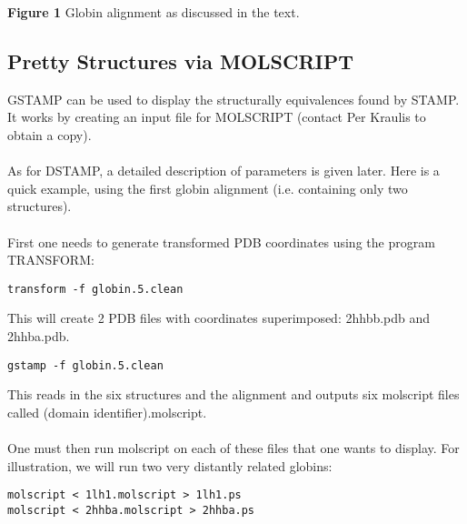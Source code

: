 \vspace*{3.5in}
\noindent
\begin{scriptsize}
{\bf Figure 1} Globin alignment as discussed in the text.
\end{scriptsize}

\subsection{Pretty Structures via MOLSCRIPT}

GSTAMP can be used to display the structurally equivalences found by 
STAMP.  It works by creating an input file for MOLSCRIPT \cite{molscript} 
(contact Per Kraulis to obtain a copy).\\
\\
As for DSTAMP, a detailed description of parameters is given later. Here 
is a quick example, using the first globin alignment (i.e. containing only
two structures).\\
\\
First one needs to generate transformed PDB coordinates using the program 
TRANSFORM:

\begin{scriptsize}\begin{verbatim}
transform -f globin.5.clean
\end{verbatim} \end{scriptsize}

This will create 2 PDB files with coordinates superimposed: 2hhbb.pdb and 2hhba.pdb.\\

\begin{scriptsize}\begin{verbatim}
gstamp -f globin.5.clean
\end{verbatim} \end{scriptsize}

This reads in the six structures and the alignment and outputs six
molscript files called (domain identifier).molscript.\\
\\
One must then run molscript on each of these files that one wants to display.  For illustration,
we will run two very distantly related globins:

\begin{scriptsize}\begin{verbatim}
molscript < 1lh1.molscript > 1lh1.ps
molscript < 2hhba.molscript > 2hhba.ps
\end{verbatim} \end{scriptsize}

